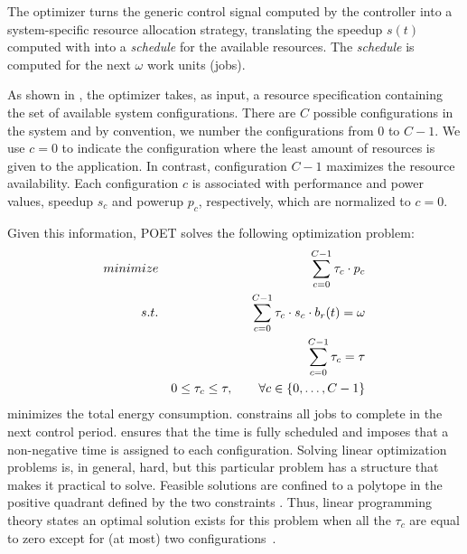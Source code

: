 The optimizer turns the generic control signal computed by the controller into a system-specific resource allocation strategy, translating the speedup $s(t)$ computed with  into a \emph{schedule} for the available resources.
The \emph{schedule} is computed for the next $\omega$ work units (jobs).

As shown in , the optimizer takes, as input, a resource specification containing the set of available system configurations.
There are $C$ possible configurations in the system and by convention, we number the configurations from $0$ to $C-1$.
We use $c = 0$ to indicate the configuration where the least amount of resources is given to the application. %
In contrast, configuration $C-1$ maximizes the resource availability.
Each configuration $c$ is associated with performance and power values, speedup $s_c$ and powerup $p_c$, respectively, which are normalized to $c = 0$.

Given this information, POET solves the following optimization problem:
\begin{eqnarray}
\minimize && \sum_{c=0}^{C-1} \tau_c \cdot p_c \label{eqn:poet-power} \\
\st %
&& \sum_{c=0}^{C-1} \tau_c \cdot s_c \cdot b_r(t) =  \omega \label{eqn:poet-work} \\
&& \sum_{c=0}^{C-1} \tau_c =  \tau \label{eqn:poet-deadline} \\
&& 0 \le \tau_c \le \tau, \qquad \forall c \in \{0,\ldots,C-1\} \label{eqn:poet-time}
\end{eqnarray}
 minimizes the total energy consumption.
 constrains all jobs to complete in the next control period.
 ensures that the time is fully scheduled and  imposes that a non-negative time is assigned to each configuration.
Solving linear optimization problems is, in general, hard, but this particular problem has a structure that makes it practical to solve.
Feasible solutions are confined to a polytope in the positive quadrant defined by the two constraints .
Thus, linear programming theory states an optimal solution exists for this problem when all the $\tau_c$ are equal to zero except for (at most) two configurations~\cite{LP}.

